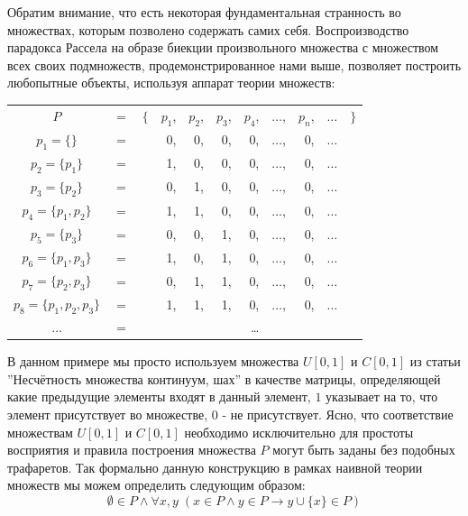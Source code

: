\documentclass[12pt]{article}
\begin{document}
Обратим внимание, что есть некоторая фундаментальная странность во множествах, которым позволено содержать самих себя. Воспроизводство парадокса Рассела на образе биекции произвольного множества с множеством всех своих подмножеств, продемонстрированное нами выше, позволяет построить любопытные объекты, используя аппарат теории множеств:
\begin{center}
\begin{tabular}{c c c r r r r r r r c}
$P$ & $=$ & $\{$ & $p_1$, & $p_2$, & $p_3$, & $p_4$, & $\dots$, & $p_n$, & $\dots$ & $\}$\\
$p_1 = \{\}$ & $=$  &  & 0, & 0, & 0, & 0, & $\dots$, & 0, & $\dots$ & \\
$p_2 = \{ p_1 \}$ & $=$  &  & 1, & 0, & 0, & 0, & $\dots$, & 0, & $\dots$ & \\
$p_3 = \{ p_2 \}$ & $=$  &  & 0, & 1, & 0, & 0, & $\dots$, & 0, & $\dots$ & \\
$p_4 = \{ p_1, p_2 \}$ & $=$  &  & 1, & 1, & 0, & 0, & $\dots$, & 0, & $\dots$ & \\
$p_5 = \{ p_3 \}$ & $=$  &  & 0, & 0, & 1, & 0, & $\dots$, & 0, & $\dots$ & \\
$p_6 = \{ p_1, p_3 \}$ & $=$  &  & 1, & 0, & 1, & 0, & $\dots$, & 0, & $\dots$ & \\
$p_7 = \{ p_2, p_3 \}$ & $=$  &  & 0, & 1, & 1, & 0, & $\dots$, & 0, & $\dots$ & \\
$p_8 = \{ p_1, p_2, p_3 \}$ & $=$  &  & 1, & 1, & 1, & 0, & $\dots$, & 0, & $\dots$ & \\
$\dots$ & $=$  &  &  &  &  & \dots &  &  &  & 
\end{tabular}
\end{center}

В данном примере мы просто используем множества $U[0, 1]$ и $C[0, 1]$ из статьи ''Несчётность множества континуум, шах'' в качестве матрицы, определяющей какие предыдущие элементы входят в данный элемент, $1$ указывает на то, что элемент присутствует во множестве, $0$ - не присутствует. Ясно, что соответствие множествам $U[0, 1]$ и $C[0, 1]$ необходимо исключительно для простоты восприятия и правила построения множества $P$ могут быть заданы без подобных трафаретов. Так формально данную конструкцию в рамках наивной теории множеств мы можем определить следующим образом:
\begin{equation}
\emptyset \in P \wedge \forall x, y \; (x \in P \wedge y \in P \rightarrow y \cup \{ x \} \in P)
\end{equation}
\end{document}
